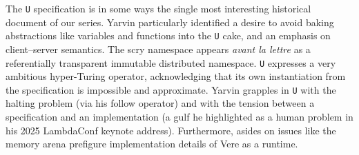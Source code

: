 \documentclass[twoside]{article}
\begin{document}
The \texttt{U} specification is in some ways the single most interesting historical document of our series.  Yarvin particularly identified a desire to avoid baking abstractions like variables and functions into the \texttt{U} cake, and an emphasis on client–server semantics.  The scry namespace appears \emph{avant la lettre} as a referentially transparent immutable distributed namespace.  \texttt{U} expresses a very ambitious hyper-Turing operator, acknowledging that its own instantiation from the specification is impossible and approximate.  Yarvin grapples in \texttt{U} with the halting problem (via his follow operator) and with the tension between a specification and an implementation (a gulf he highlighted as a human problem in his 2025 LambdaConf keynote address).  Furthermore, asides on issues like the memory arena prefigure implementation details of Vere as a runtime.
\end{document}
